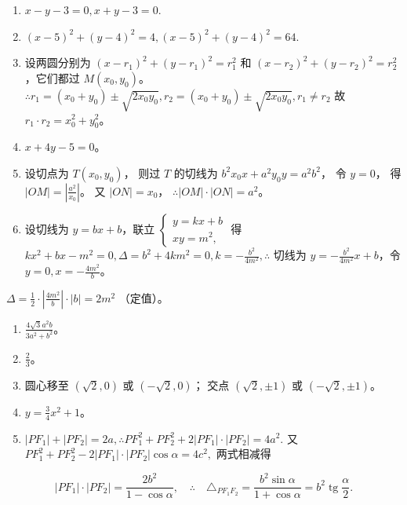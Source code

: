 \begin{enumerate}
\def\labelenumi{\arabic{enumi}.}
\item
  \(x - y - 3 = 0, x + y - 3 = 0.\)
\item
  \((x - 5)^{2} + (y - 4)^{2} = 4, (x - 5)^{2} + (y - 4)^{2} = 64.\)
\item
  设两圆分别为 \((x - r_1)^2 + (y - r_1)^2 = r_1^2\) 和
  \((x - r_2)^2 + (y - r_2)^2 = r_2^2\)，它们都过 \(M(x_0, y_0)\)。
  \(\therefore r_1 = (x_0 + y_0) \pm \sqrt{2x_0y_0}, r_2 = (x_0 + y_0) \pm \sqrt{2x_0y_0}, r_1 \neq r_2\)
  故 \(r_1 \cdot r_2 = x_0^2 + y_0^2\)。
\item
  \(x + 4y - 5 = 0\)。
\item
  设切点为 \(T(x_0, y_0)\)， 则过 \(T\) 的切线为
  \(b^2 x_0 x + a^2 y_0 y = a^2 b^2\)， 令 \(y = 0\)， 得
  \(|OM| = \left|\frac{a^2}{x_0}\right|\)。 又 \(|ON| = x_0\)，
  \(\therefore |OM| \cdot |ON| = a^2\)。
\item
  设切线为 \(y = bx + b\)，联立
  \(\left\{ \begin{array}{l} y = kx + b \\ xy = m^2, \end{array} \right.\)
  得
  \(kx^2 + bx - m^2 = 0, \Delta = b^2 + 4km^2 = 0, k = -\frac{b^2}{4m^2}, \therefore\)
  切线为 \(y = -\frac{b^2}{4m^2}x + b\)，令
  \(y = 0, x = -\frac{4m^2}{b}\)。
\end{enumerate}

\(\Delta = \frac{1}{2} \cdot \left| \frac{4m^2}{b} \right| \cdot |b| = 2m^2\)
（定值）。

\begin{enumerate}
\def\labelenumi{\arabic{enumi}.}
\setcounter{enumi}{6}
\item
  \(\frac{4\sqrt{3}a^2b}{3a^2 + b^2}\)。
\item
  \(\frac{2}{3}\)。
\item
  圆心移至 \((\sqrt{2}, 0)\) 或 \((- \sqrt{2}, 0)\)； 交点
  \((\sqrt{2}, \pm 1)\) 或 \((- \sqrt{2}, \pm 1)\)。
\item
  \(y = \frac{3}{4} x^2 + 1\)。
\item
  \(|PF_1| + |PF_2| = 2a, \therefore PF_1^2 + PF_2^2 + 2|PF_1| \cdot |PF_2| = 4a^2.\)
  又
  \(PF_{1}^{2} + PF_{2}^{2} - 2|PF_{1}|\cdot |PF_{2}|\cos \alpha = 4c^{2},\)
  两式相减得
\end{enumerate}

\[
\left| PF_{1} \right| \cdot \left| PF_{2} \right| = \frac {2 b^{2}}{1 - \cos \alpha}, \quad \therefore \quad \triangle_ {PF_{1} F_{2}} = \frac {b^{2} \sin \alpha}{1 + \cos \alpha} = b^{2} \operatorname{tg} \frac {\alpha}{2}.
\]

